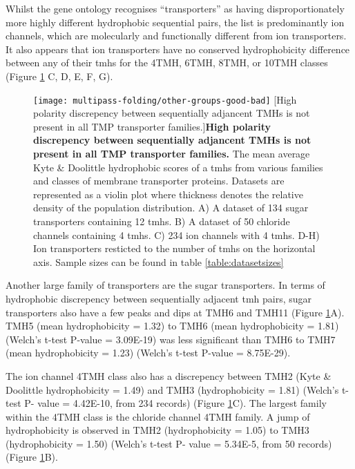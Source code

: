 Whilst the gene ontology recognises ``transporters'' as having disproportionately more highly different hydrophobic sequential pairs, the list is predominantly ion channels, which are molecularly and functionally different from ion transporters.
It also appears that ion transporters have no conserved hydrophobicity difference between any of their \gls{tmh}s for the 4TMH, 6TMH, 8TMH, or 10TMH classes (Figure \ref{fig:other-groups-good-bad} C, D, E, F, G).

\begin{figure}[!ht]
\centering
\texttt{[image: multipass-folding/other-groups-good-bad]}
		[High polarity discrepency between sequentially adjancent TMHs is not present in all TMP transporter families.]{\textbf{High polarity discrepency between sequentially adjancent TMHs is not present in all TMP transporter families.}
    The mean average Kyte \& Doolittle hydrophobic scores of a \gls{tmh}s from various families and classes of membrane transporter proteins.
    Datasets are represented as a violin plot where thickness denotes the relative density of the population distribution.
    A) A dataset of  134 sugar transporters containing 12 \gls{tmh}s.
    B) A dataset of 50 chloride channels containing 4 \gls{tmh}s.
    C) 234 ion channels with 4 \gls{tmh}s.
    D-H) Ion transporters resticted to the number of \gls{tmh}s on the horizontal axis.
    Sample sizes can be found in table \ref{table:datasetsizes}}

\label{fig:other-groups-good-bad}
\end{figure}

Another large family of transporters are the sugar transporters.
In terms of hydrophobic discrepency between sequentially adjacent \gls{tmh} pairs, sugar transporters also have a few peaks and dips at TMH6 and TMH11 (Figure \ref{fig:other-groups-good-bad}A).
TMH5 (mean hydrophobicity = 1.32) to TMH6 (mean hydrophobicity = 1.81) (Welch's t\--test P\--value = 3.09E-19) was less significant than TMH6 to TMH7 (mean hydrophobicity = 1.23) (Welch's t\--test P\--value = 8.75E-29).

The ion channel 4TMH class also has a discrepency between TMH2 (Kyte \& Doolittle hydrophobicity = 1.49) and TMH3 (hydrophobicity = 1.81) (Welch's t\--test P\-- value = 4.42E-10, from 234 records) (Figure \ref{fig:other-groups-good-bad}C).
The largest family within the 4TMH class is the chloride channel 4TMH family.
A jump of hydrophobicity is observed in TMH2 (hydrophobicity = 1.05) to TMH3 (hydrophobicity = 1.50) (Welch's t\--test P\-- value = 5.34E-5, from 50 records) (Figure \ref{fig:other-groups-good-bad}B).

